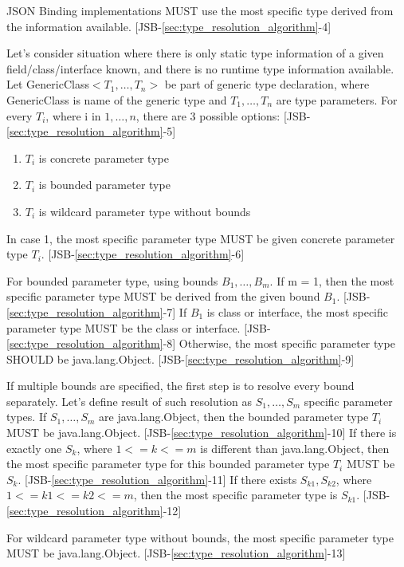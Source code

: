 JSON Binding implementations MUST use the most specific type derived from the information available. [JSB-\ref{sec:type_resolution_algorithm}-4]

Let's consider situation where there is only static type information of a given field/class/interface known, and there is no runtime type information available. Let GenericClass\(<T_1,\dotsc,T_n>\) be part of generic type declaration, where GenericClass is name of the generic type and \(T_1,\dotsc,T_n\) are type parameters. For every \(T_i\), where i in \(1,\dotsc,n\), there are 3 possible options: [JSB-\ref{sec:type_resolution_algorithm}-5]

\begin{enumerate}
	\item \(T_i\) is concrete parameter type
	\item \(T_i\) is bounded parameter type
	\item \(T_i\) is wildcard parameter type without bounds
\end{enumerate}

In case 1, the most specific parameter type MUST be given concrete parameter type \(T_i\). [JSB-\ref{sec:type_resolution_algorithm}-6]

For bounded parameter type, using bounds \(B_1,\dotsc,B_m\). If m = 1, then the most specific parameter type MUST be derived from the given bound \(B_1\). [JSB-\ref{sec:type_resolution_algorithm}-7] If \(B_1\) is class or interface, the most specific parameter type MUST be the class or interface. [JSB-\ref{sec:type_resolution_algorithm}-8] Otherwise, the most specific parameter type SHOULD be java.lang.Object. [JSB-\ref{sec:type_resolution_algorithm}-9]

If multiple bounds are specified, the first step is to resolve every bound separately. Let's define result of such resolution as \(S_1,\dotsc,S_m\) specific parameter types. If \(S_1,\dotsc,S_m\) are java.lang.Object, then the bounded parameter type \(T_i\) MUST be java.lang.Object. [JSB-\ref{sec:type_resolution_algorithm}-10] 
If there is exactly one \(S_k\), where \(1<=k<=m\) is different than java.lang.Object, then the most specific parameter type for this bounded parameter type \(T_i\) MUST be \(S_k\). [JSB-\ref{sec:type_resolution_algorithm}-11] If there exists \(S_{k1},S_{k2}\), where \(1<=k1<=k2<=m\), then the most specific parameter type is \(S_{k1}\). [JSB-\ref{sec:type_resolution_algorithm}-12]

For wildcard parameter type without bounds, the most specific parameter type MUST be java.lang.Object. [JSB-\ref{sec:type_resolution_algorithm}-13]


